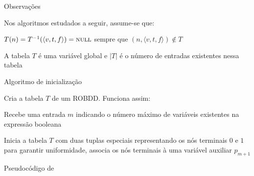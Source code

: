 \expandafter\documentclass\expandafter[table, usenames, svgnames, dvipsnames,14pt, \classopts]{beamer}
\begin{document}
    
\begin{frame}{Observações}

    Nos algoritmos estudados a seguir, assume-se que:

    \begin{outline}
        \1 $T(n) = T^{-1}(\langle v,t,f \rangle) = \textproc{null}$ sempre que $(n, \langle v,t,f \rangle) \notin T$
        
        \vspace{1em}
        
        \1 A tabela $T$ é uma variável global e $|T|$ é o número de entradas existentes nessa tabela
    \end{outline}
    
\end{frame}

\begin{frame}{Algoritmo de inicialização}

    Cria a tabela $T$ de um ROBDD. Funciona assim:

    \small
    \begin{outline}
        \1 Recebe uma entrada $m$ indicando o número máximo de variáveis existentes na expressão booleana
        
        \vspace{1em}
        
        \1 Inicia a tabela $T$ com duas tuplas especiais
            \2[-] representando os nós terminais $0$ e $1$
            \2[-] para garantir uniformidade, associa os nós terminais à uma variável auxiliar $p_{m+1}$
    \end{outline}

\end{frame}

\begin{frame}{Pseudocódigo de }
    \begin{algorithm}[H]
    \end{algorithm}

\end{frame}
\end{document}
